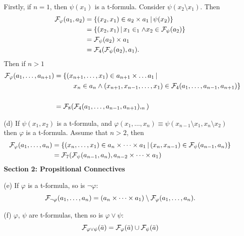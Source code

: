 \documentclass{article}
\begin{document}
\begin{enumerate}
          Firstly, if $n=1$, then $\psi(x_{1})$ is a t-formula. Consider $\psi(x_{2}\setminus x_{1})$. Then \begin{align*}
              \calF_{\varphi}(a_{1},a_{2}) & = \{ (x_{2},x_{1}) \in a_{2}\times a_{1} \, | \, \psi(x_{2})\}                   \\
                                           & = \{ (x_{2},x_{1}) \, | \, x_{1} \in _{1} \wedge x_{2} \in \calF_{\psi}(a_{2})\} \\
                                           & = \calF_{\psi}(a_{2}) \times a_{1}                                               \\
                                           & = \calF_{4}(\calF_{\psi}(a_{2}),a_{1}).
          \end{align*}
          Then if $n>1$ \begin{align*}
              \calF_{\varphi}(a_{1}, \dots, a_{n+1}) & = \{ (x_{n+1},\dots, x_{1}) \in a_{n+1} \times \dots a_{1} \, | \, \\ &\hspace{1cm} x_{n} \in a_{n} \wedge (x_{n+1},x_{n-1},\dots,x_{1}) \in \calF_{4}(a_{1},\dots, a_{n-1}, a_{n+1}) \}\\ \hspace{0.1cm}\\
                                                     & = \calF_{8}(\calF_{4}(a_{1},\dots,a_{n-1},a_{n+1}),_{n})
          \end{align*}
    \item[(d)] If $\psi(x_{1},x_{2})$ is a t-formula, and $\varphi(x_{1},\dots,x_{n}) \equiv \psi(x_{n-1}\setminus x_{1}, x_{n}\setminus x_{2})$ then $\varphi$ is a t-formula. Assume that $n>2$, then \begin{align*}
              \mathcal{F}_{\varphi}(a_{1},\dots,a_{n}) & = \{ (x_{n}, \dots, x_{1}) \in a_{n} \times \dots \times a_{1} \, | \, (x_{n}, x_{n-1}) \in \mathcal{F}_{\psi}(a_{n-1},a_{n}) \} \\
                                                 & = \mathcal{F}_{7}(\mathcal{F}_{\psi}(a_{n-1},a_{n}),a_{n-2} \times \dots \times a_{1})
          \end{align*}
          \textbf{Section 2: Propsitional Connectives}
    \item[(e)] If $\varphi$ is a t-formula, so is $\neg \varphi$: \[ \mathcal{F}_{\neg \varphi}(a_{1},\dots, a_{n}) = (a_{n} \times \dots \times a_{1}) \setminus \mathcal{F}_{\varphi}(a_{1},\dots,a_{n}).\]
    \item[(f)] $\varphi$, $\psi$ are t-formulas, then so is $\varphi \vee \psi$: \[ \mathcal{F}_{\varphi \vee \psi}(\bar{a}) = \mathcal{F}_{\varphi}(\bar{a}) \cup \mathcal{F}_{\psi}(\bar{a})\]

\end{enumerate}
\end{document}

